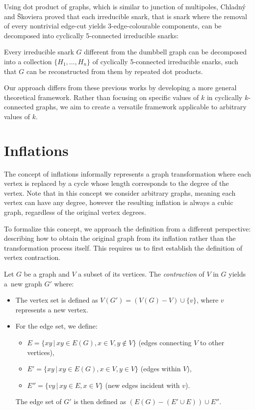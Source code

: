 \documentclass[12pt, twoside]{book}
\begin{document}
Using dot product of graphs, which is similar to junction of multipoles, Chladný and Škoviera \cite{Chladny2010} proved that each irreducible snark, that is snark where the removal of every nontrivial edge-cut yields 3-edge-colourable components, can be decomposed into cyclically 5-connected irreducible snarks:

\begin{theorem}
	Every irreducible snark $G$ different from the dumbbell graph can be decomposed into a collection $\{H_1, \dots , H_n\}$ of cyclically 5-connected irreducible snarks, such that $G$ can be reconstructed from them by repeated dot products.
\end{theorem}

Our approach differs from these previous works by developing a more general theoretical framework. Rather than focusing on specific values of $k$ in cyclically \mbox{$k$-connected} graphs, we aim to create a versatile framework applicable to arbitrary values of $k$.

\section{Inflations}\label{sec:inflations}

The concept of inflations informally represents a graph transformation where each vertex is replaced by a cycle whose length corresponds to the degree of the vertex. Note that in this concept we consider arbitrary graphs, meaning each vertex can have any degree, however the resulting inflation is always a cubic graph, regardless of the original vertex degrees.

To formalize this concept, we approach the definition from a different perspective: describing how to obtain the original graph from its inflation rather than the transformation process itself. This requires us to first establish the definition of vertex contraction.

Let $G$ be a graph and $V$ a subset of its vertices. The \textit{contraction} of $V$ in $G$ yields a~new graph $G'$ where:
\begin{itemize}
	\item The vertex set is defined as $V(G') = (V(G)-V)\cup \{v\}$, where $v$ represents a new vertex.
	\item For the edge set, we define:
	\begin{itemize}
		\item $E=\{xy\,|\,xy\in E(G), x\in V, y\notin V\}$ (edges connecting $V$ to other vertices),
		\item $E'=\{xy\,|\,xy\in E(G), x\in V, y\in V\}$ (edges within $V$),
		\item $E''=\{vy\,|\, xy\in E, x\in V\}$ (new edges incident with $v$).
	\end{itemize}
	
	The edge set of $G'$ is then defined as ${\left(E(G)-\left(E'\cup E\right)\right)\cup E''}$.
\end{itemize}
\end{document}
